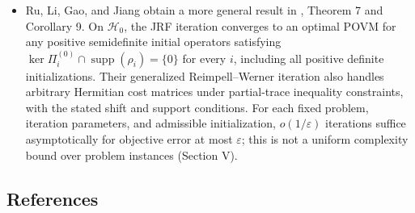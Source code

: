 \begin{itemize}
  \item Ru, Li, Gao, and Jiang obtain a more general result in , Theorem 7 and Corollary 9. On $\mathcal H_0$, the JRF iteration converges to an optimal POVM for any positive semidefinite initial operators satisfying $\ker\Pi_i^{(0)}\cap\operatorname{supp}(\rho_i)=\{0\}$ for every $i$, including all positive definite initializations. Their generalized Reimpell--Werner iteration also handles arbitrary Hermitian cost matrices under partial-trace inequality constraints, with the stated shift and support conditions. For each fixed problem, iteration parameters, and admissible initialization, $o(1/\varepsilon)$ iterations suffice asymptotically for objective error at most $\varepsilon$; this is not a uniform complexity bound over problem instances (Section V).
\end{itemize}

\subsection*{References}

